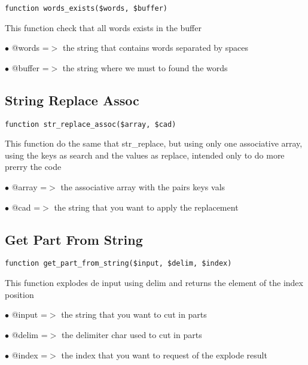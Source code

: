\documentclass[a4paper]{book}
\begin{document}
\begin{lstlisting}
function words_exists($words, $buffer)
\end{lstlisting}

This function check that all words exists in the buffer

\begin{compactitem}
\item[\color{myblue}$\bullet$] @words  =$>$ the string that contains words separated by spaces
\item[\color{myblue}$\bullet$] @buffer =$>$ the string where we must to found the words
\end{compactitem}

\hypertarget{toc261}{}
\subsection{String Replace Assoc}

\begin{lstlisting}
function str_replace_assoc($array, $cad)
\end{lstlisting}

This function do the same that str\_replace, but using only one associative
array, using the keys as search and the values as replace, intended only
to do more prerry the code

\begin{compactitem}
\item[\color{myblue}$\bullet$] @array =$>$ the associative array with the pairs keys vals
\item[\color{myblue}$\bullet$] @cad   =$>$ the string that you want to apply the replacement
\end{compactitem}

\hypertarget{toc262}{}
\subsection{Get Part From String}

\begin{lstlisting}
function get_part_from_string($input, $delim, $index)
\end{lstlisting}

This function explodes de input using delim and returns the element
of the index position

\begin{compactitem}
\item[\color{myblue}$\bullet$] @input =$>$ the string that you want to cut in parts
\item[\color{myblue}$\bullet$] @delim =$>$ the delimiter char used to cut in parts
\item[\color{myblue}$\bullet$] @index =$>$ the index that you want to request of the explode result
\end{compactitem}
\end{document}
